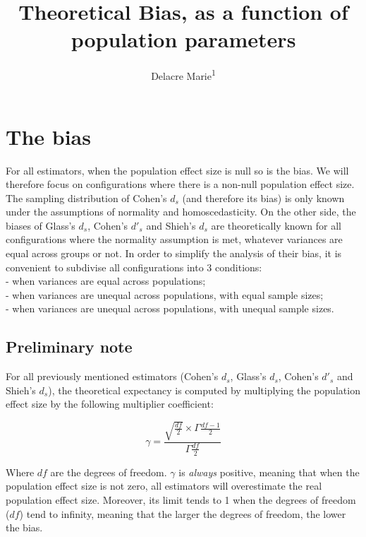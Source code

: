 \documentclass[
  man]{apa6}
\affiliation{
\vspace{0.5cm}
\textsuperscript{1} ULB}
\title{Theoretical Bias, as a function of population parameters}
\author{Delacre Marie\textsuperscript{1}}
\date{}
\begin{document}
\maketitle

\hypertarget{the-bias}{%
\section{The bias}\label{the-bias}}

For all estimators, when the population effect size is null so is the bias. We will therefore focus on configurations where there is a non-null population effect size. The sampling distribution of Cohen's \(d_s\) (and therefore its bias) is only known under the assumptions of normality and homoscedasticity. On the other side, the biases of Glass's \(d_s\), Cohen's \(d'_s\) and Shieh's \(d_s\) are theoretically known for all configurations where the normality assumption is met, whatever variances are equal across groups or not. In order to simplify the analysis of their bias, it is convenient to subdivise all configurations into 3 conditions:\\
- when variances are equal across populations;\\
- when variances are unequal across populations, with equal sample sizes;\\
- when variances are unequal across populations, with unequal sample sizes.

\hypertarget{preliminary-note}{%
\subsection{Preliminary note}\label{preliminary-note}}

For all previously mentioned estimators (Cohen's \(d_s\), Glass's \(d_s\), Cohen's \(d'_s\) and Shieh's \(d_s\)), the theoretical expectancy is computed by multiplying the population effect size by the following multiplier coefficient:

\begin{equation} 
\gamma=\frac{\sqrt{\frac{df}{2}} \times \Gamma{\frac{df-1}{2}}}{\Gamma{\frac{df}{2}}}
\label{eq:mc}
\end{equation}

Where \(df\) are the degrees of freedom. \(\gamma\) is \emph{always} positive, meaning that when the population effect size is not zero, all estimators will overestimate the real population effect size. Moreover, its limit tends to 1 when the degrees of freedom (\(df\)) tend to infinity, meaning that the larger the degrees of freedom, the lower the bias.
\end{document}
